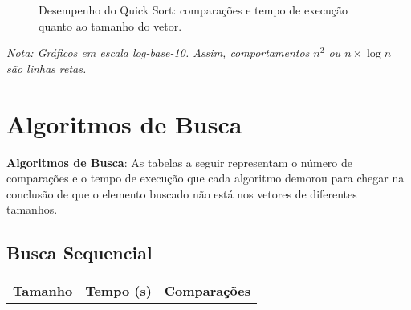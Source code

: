 \documentclass[conference]{IEEEtran}
\begin{document}
{\begin{figure}[H]
         \begin{adjustwidth}{0.58cm}{}
    \end{adjustwidth}
    \caption{Desempenho do Quick Sort: comparações e tempo de execução quanto ao tamanho do vetor. }
    \label{fig:quickSortPerformanceGraph}
\end{figure}
\vspace{-0.4cm}
{\small \textit{Nota: Gráficos em escala log-base-10. Assim, comportamentos \(n^2\) ou \(n \times \log n\) são linhas retas.}}

\section{Algoritmos de Busca}

\textbf{Algoritmos de Busca}: As tabelas a seguir representam o número de comparações e o tempo de execução que cada algoritmo demorou para chegar na conclusão de que o elemento buscado não está nos vetores de diferentes tamanhos.

\subsection*{Busca Sequencial}
\begin{tabularx}{0.5\textwidth}{X|X|X}
\hline
\textbf{Tamanho} & \textbf{Tempo (s)} & \textbf{Comparações} \\


\end{tabularx}}
\end{document}
